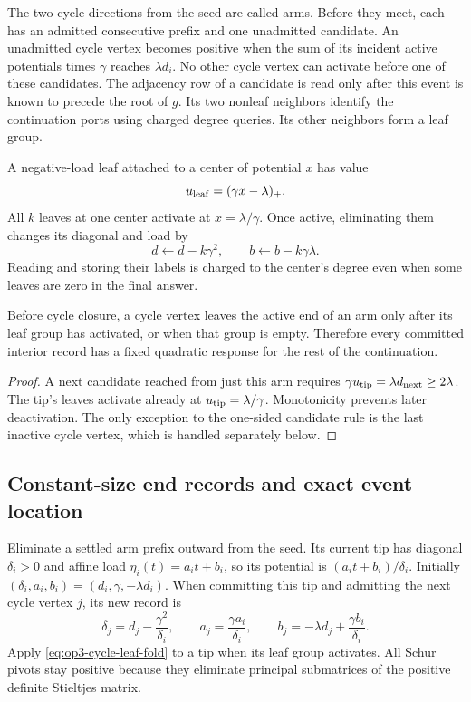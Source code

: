 The two cycle directions from the seed are called arms. Before they meet,
each has an admitted consecutive prefix and one unadmitted candidate. An
unadmitted cycle vertex becomes positive when the sum of its incident
active potentials times $\gamma$ reaches $\lambda d_i$. No other cycle
vertex can activate before one of these candidates. The adjacency row of
a candidate is read only after this event is known to precede the root of
$g$. Its two nonleaf neighbors identify the continuation ports using
charged degree queries. Its other neighbors form a leaf group.

A negative-load leaf attached to a center of potential $x$ has value
\begin{equation}
 u_{\rm leaf}=(\gamma x-\lambda)_+.
 \label{eq:op3-cycle-leaf}
\end{equation}
All $k$ leaves at one center activate at $x=\lambda/\gamma$. Once active,
eliminating them changes its diagonal and load by
\begin{equation}
 d\longleftarrow d-k\gamma^2,\qquad
 b\longleftarrow b-k\gamma\lambda.
 \label{eq:op3-cycle-leaf-fold}
\end{equation}
Reading and storing their labels is charged to the center's degree even
when some leaves are zero in the final answer.

\begin{lemma}
\label{lem:op3-cycle-settled}
Before cycle closure, a cycle vertex leaves the active end of an arm only
after its leaf group has activated, or when that group is empty. Therefore
every committed interior record has a fixed quadratic response for the
rest of the continuation.
\end{lemma}
\begin{proof}
A next candidate reached from just this arm requires
$\gamma u_{\rm tip}=\lambda d_{\rm next}\geq2\lambda$.
The tip's leaves activate already at $u_{\rm tip}=\lambda/\gamma$.
Monotonicity prevents later deactivation. The only exception to the
one-sided candidate rule is the last inactive cycle vertex, which is
handled separately below.
\end{proof}

\subsection{Constant-size end records and exact event location}

Eliminate a settled arm prefix outward from the seed. Its current tip has
diagonal $\delta_i>0$ and affine load $\eta_i(t)=a_i t+b_i$, so its
potential is $(a_i t+b_i)/\delta_i$. Initially
$(\delta_i,a_i,b_i)=(d_i,\gamma,-\lambda d_i)$. When committing this tip
and admitting the next cycle vertex $j$, its new record is
\begin{equation}
 \delta_j=d_j-\frac{\gamma^2}{\delta_i},\qquad
 a_j=\frac{\gamma a_i}{\delta_i},\qquad
 b_j=-\lambda d_j+\frac{\gamma b_i}{\delta_i}.
 \label{eq:op3-cycle-append}
\end{equation}
Apply \cref{eq:op3-cycle-leaf-fold} to a tip when its leaf group activates.
All Schur pivots stay positive because they eliminate principal submatrices
of the positive definite Stieltjes matrix.

